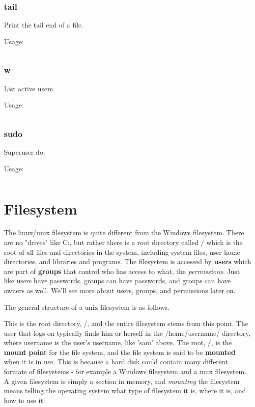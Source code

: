 \documentclass{article}
\begin{document}
	\subsubsection{tail}
	Print the tail end of a file.
	
	Usage:
	\begin{lstlisting}
	\end{lstlisting}
	
	\subsubsection{w}
	List active users. 
	
	Usage:
	\begin{lstlisting}
	\end{lstlisting}
	
	\subsubsection{sudo}
	Superuser do.
	
	Usage:
	\begin{lstlisting}
	\end{lstlisting}

	\section{Filesystem}
	The linux/unix filesystem is quite different from the Windows filesystem. There are no "drives" like C:, but rather there is a root directory called / which is the root of all files and directories in the system, including system files, user home directories, and libraries and programs. The filesystem is accessed by \textbf{users} which are part of \textbf{groups} that control who has access to what, the \textit{permissions}. Just like users have passwords, groups can have passwords, and groups can have owners as well. We'll see more about users, groups, and permissions later on. 
	
	The general structure of a unix filesystem is as follows. \\


	This is the root directory, /, and the entire filesystem stems from this point. The user that logs on typically finds him or herself in the /home/username/ directory, where username is the user's username, like 'sam' above. The root, /, is the \textbf{mount point} for the file system, and the file system is said to be \textbf{mounted} when it is in use. This is because a hard disk could contain many different formats of filesystems - for example a Windows filesystem and a unix filesystem. A given filesystem is simply a section in memory, and \textit{mounting} the filesystem means telling the operating system what type of filesystem it is, where it is, and how to use it. 
	
\end{document}
